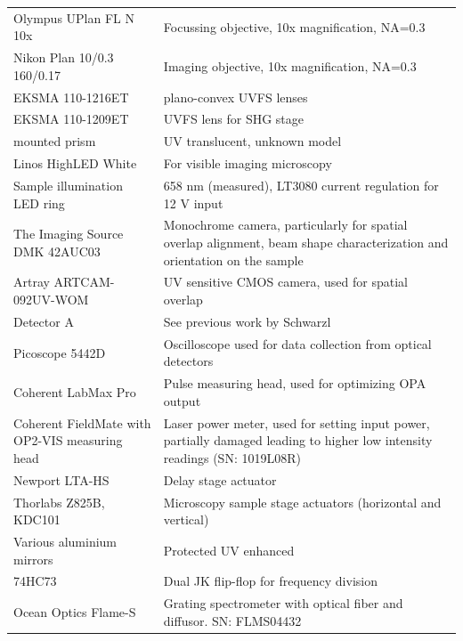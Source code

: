 \documentclass[twoside,openright,listof=numbered]{scrreprt}
\begin{document}
\begin{longtable}{p{}p{}}
    Olympus UPlan FL N 10x & Focussing objective, 10x magnification, NA=0.3 \\
    Nikon Plan 10/0.3 160/0.17 & Imaging objective, 10x magnification, NA=0.3 \\
    EKSMA 110-1216ET& plano-convex UVFS lenses\\
    EKSMA 110-1209ET& UVFS lens for SHG stage\\
    mounted prism & UV translucent, unknown model\\
    Linos HighLED White & For visible imaging microscopy \\
    Sample illumination LED ring & 658 nm (measured), LT3080 current regulation for 12 V input \\
    The Imaging Source DMK 42AUC03 & Monochrome camera, particularly for spatial overlap alignment, beam shape characterization and orientation on the sample \\
    Artray ARTCAM-092UV-WOM & UV sensitive CMOS camera, used for spatial overlap\\
    Detector A & See previous work by Schwarzl \cite{Schwarzl2022} \\
    Picoscope 5442D & Oscilloscope used for data collection from optical detectors \\
    Coherent LabMax Pro & Pulse measuring head, used for optimizing OPA output \\
    Coherent FieldMate with OP2-VIS measuring head & Laser power meter, used for setting input power, partially damaged leading to higher low intensity readings (SN: 1019L08R) \\
    Newport LTA-HS & Delay stage actuator \\
    Thorlabs Z825B, KDC101 & Microscopy sample stage actuators (horizontal and vertical) \\
    Various aluminium mirrors & Protected UV enhanced \\
    74HC73 & Dual JK flip-flop for frequency division\\
    Ocean Optics Flame-S & Grating spectrometer with optical fiber and diffusor. SN: FLMS04432 
\end{longtable}
\end{document}
